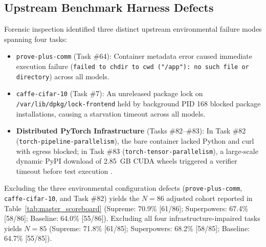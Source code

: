 \subsection{Upstream Benchmark Harness Defects}
Forensic inspection identified three distinct upstream environmental failure modes spanning four tasks:
\begin{itemize}
    \item \texttt{prove-plus-comm} (Task \#64): Container metadata error caused immediate execution failure (\texttt{failed to chdir to cwd ("/app"): no such file or directory}) across all models.
    \item \texttt{caffe-cifar-10} (Task \#7): An unreleased package lock on \texttt{/var/lib/dpkg/lock-frontend} held by background PID 168 blocked package installations, causing a starvation timeout across all models.
    \item \textbf{Distributed PyTorch Infrastructure} (Tasks \#82--\#83): In Task \#82 (\texttt{torch-pipeline-parallelism}), the bare container lacked Python and curl with egress blocked; in Task \#83 (\texttt{torch-tensor-parallelism}), a large-scale dynamic PyPI download of 2.85~GB CUDA wheels triggered a verifier timeout before test execution \cite{shoeybi2019megatron}.
\end{itemize}
Excluding the three environmental configuration defects (\texttt{prove-plus-comm}, \texttt{caffe-cifar-10}, and Task \#82) yields the $N=86$ adjusted cohort reported in Table~\ref{tab:master_scoreboard} (Supreme: 70.9\% [61/86]; Superpowers: 67.4\% [58/86]; Baseline: 64.0\% [55/86]). Excluding all four infrastructure-impaired tasks yields $N=85$ (Supreme: 71.8\% [61/85]; Superpowers: 68.2\% [58/85]; Baseline: 64.7\% [55/85]).

